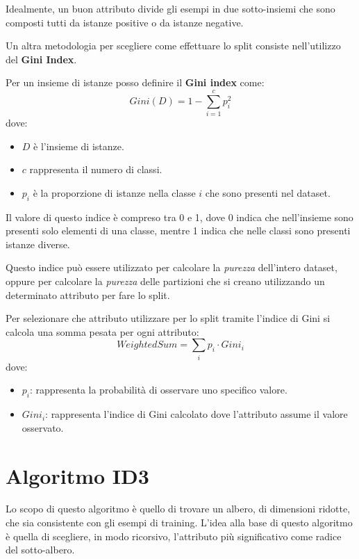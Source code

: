 Idealmente, un buon attributo divide gli esempi in due sotto-insiemi che sono
composti tutti da istanze positive o da istanze negative.

Un altra metodologia per scegliere come effettuare lo split consiste nell'utilizzo
del \textbf{Gini Index}.
\begin{definizione}
    Per un insieme di istanze posso definire il \textbf{Gini index} come:
    \begin{equation}
        Gini(D) = 1 - \sum_{i = 1}^c p_i^2
    \end{equation}
    dove: \begin{itemize}
        \item $D$ è l'insieme di istanze.
        \item $c$ rappresenta il numero di classi.
        \item $p_i$ è la proporzione di istanze nella classe $i$ che sono presenti
              nel dataset.
    \end{itemize}

    Il valore di questo indice è compreso tra 0 e 1, dove 0 indica che nell'insieme
    sono presenti solo elementi di una classe, mentre 1 indica che nelle classi
    sono presenti istanze diverse.
\end{definizione}
Questo indice può essere utilizzato per calcolare la \textit{purezza} dell'intero
dataset, oppure per calcolare la \textit{purezza} delle partizioni che si creano
utilizzando un determinato attributo per fare lo split.

Per selezionare che attributo utilizzare per lo split tramite l'indice di Gini
si calcola una somma pesata per ogni attributo:
\begin{equation}
    WeightedSum = \sum_{i} p_i \cdot Gini_i
\end{equation}
dove:
\begin{itemize}
    \item $p_i$: rappresenta la probabilità di osservare uno specifico valore.
    \item $Gini_i$: rappresenta l'indice di Gini calcolato dove l'attributo assume
          il valore osservato.
\end{itemize}
\section{Algoritmo ID3}
Lo scopo di questo algoritmo è quello di trovare un albero, di dimensioni ridotte,
che sia consistente con gli esempi di training. L'idea alla base di questo algoritmo
è quella di scegliere, in modo ricorsivo, l'attributo più significativo come radice
del sotto-albero.

